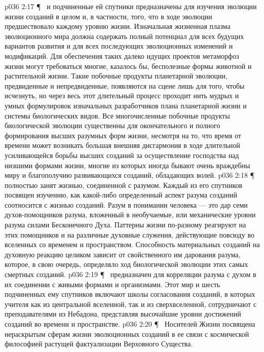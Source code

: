 \vs p036 2:17 \P\  и подчиненные ей спутники предназначены для изучения эволюции жизни созданий в целом и, в частности, того, что в ходе эволюции предшествовало каждому уровню жизни. Изначальная жизненная плазма эволюционного мира должна содержать полный потенциал для всех будущих вариантов развития и для всех последующих эволюционных изменений и модификаций. Для обеспечения таких далеко идущих проектов метаморфоз жизни могут требоваться многие, казалось бы, бесполезные формы животной и растительной жизни. Такие побочные продукты планетарной эволюции, предвиденные и непредвиденные, появляются на сцене лишь для того, чтобы исчезнуть, но через весь этот длительный процесс проходит нить мудрых и умных формулировок изначальных разработчиков плана планетарной жизни и системы биологических видов. Все многочисленные побочные продукты биологической эволюции существенны для окончательного и полного формирования высших разумных форм жизни, несмотря на то, что время от времени может возникать большая внешняя дисгармония в ходе длительной усиливающейся борьбы высших созданий за осуществление господства над низшими формами жизни, многие из которых иногда бывают очень враждебны миру и благополучию развивающихся созданий, обладающих волей.
\vs p036 2:18 \P\  полностью занят жизнью, соединенной с разумом. Каждый из его спутников посвящен изучению, как какой\hyp{}либо определенный аспект разума созданий соотносится с жизнью созданий. Разум в понимании человека --- это дар семи духов\hyp{}помощников разума, вложенный в необучаемые, или механические уровни разума силами Бесконечного Духа. Паттерны жизни по\hyp{}разному реагируют на этих помощников и на различные духовные служения, действующие повсюду во вселенных со временем и пространством. Способность материальных созданий на духовную реакцию целиком зависит от свойственного им дарования разума, которое, в свою очередь, определяло ход биологической эволюции этих самых смертных созданий.
\vs p036 2:19 \P\  предназначен для корреляции разума с духом в их соединении с живыми формами и организмами. Этот мир и шесть подчиненных ему спутников включают школы согласования созданий, в которых учителя как из центральной вселенной, так и из сверхвселенной, сотрудничают с преподавателями из Небадона, представляя высочайшие уровни достижений созданий во времени и пространстве.
\vs p036 2:20 \P\  Носителей Жизни посвящена нераскрытым сферам жизни эволюционных созданий в ее связи с космической философией растущей фактуализации Верховного Существа.
